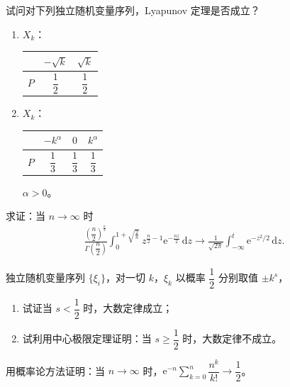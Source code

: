 \documentclass[../../main.tex]{subfiles}
\begin{document}
\begin{exercise}\label{exercise:ch05-57}
试问对下列独立随机变量序列，Lyapunov 定理是否成立？
\begin{enumerate}
\item $X_k$：
\begin{center}
\begin{tabular}{c|cc}
 & $-\sqrt{k}$ & $\sqrt{k}$\\ \hline
$P$ & $\dfrac12$ & $\dfrac12$
\end{tabular}
\end{center}
\item $X_k$：
\begin{center}
\begin{tabular}{c|ccc}
 & $-k^{\alpha}$ & $0$ & $k^{\alpha}$\\ \hline
$P$ & $\dfrac13$ & $\dfrac13$ & $\dfrac13$
\end{tabular}
\end{center}
$\alpha>0$。
\end{enumerate}
\end{exercise}

\begin{exercise}\label{exercise:ch05-58}
求证：当 $n\to\infty$ 时
\begin{align*}
\frac{\left(\dfrac n2\right)^{\frac n2}}{\Gamma\!\left(\dfrac n2\right)}\int_{0}^{1+\sqrt{\frac2n}}z^{\frac n2-1}\mathrm{e}^{-\frac{nz}{2}}\,\mathrm{d}z\to\frac{1}{\sqrt{2\pi}}\int_{-\infty}^{t}\mathrm{e}^{-z^{2}/2}\,\mathrm{d}z.
\end{align*}
\end{exercise}

\begin{exercise}\label{exercise:ch05-59}
独立随机变量序列 $\{\xi_i\}$，对一切 $k$，$\xi_k$ 以概率 $\dfrac12$ 分别取值 $\pm k^{s}$，
\begin{enumerate}
\item 试证当 $s<\dfrac12$ 时，大数定律成立；
\item 试利用中心极限定理证明：当 $s\geqslant\dfrac12$ 时，大数定律不成立。
\end{enumerate}
\end{exercise}

\begin{exercise}\label{exercise:ch05-60}
用概率论方法证明：当 $n\to\infty$ 时，$\mathrm{e}^{-n}\sum_{k=0}^{n}\dfrac{n^{k}}{k!}\to\dfrac12$。
\end{exercise}
\end{document}
